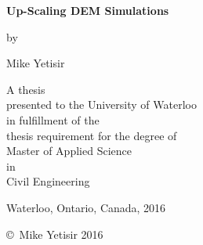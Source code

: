 \pagestyle{empty}

\begin{titlepage}
        \begin{center}
        \vspace*{1.0cm}

        \Huge
        {\bf Up-Scaling DEM Simulations}

        \vspace*{1.0cm}

        \normalsize
        by \\

        \vspace*{1.0cm}

        \Large
        Mike Yetisir \\

        \vspace*{3.0cm}

        \normalsize
        A thesis \\
        presented to the University of Waterloo \\ 
        in fulfillment of the \\
        thesis requirement for the degree of \\
        Master of Applied Science \\
        in \\
        Civil Engineering \\

        \vspace*{2.0cm}

        Waterloo, Ontario, Canada, 2016 \\

        \vspace*{1.0cm}

        \copyright\ Mike Yetisir 2016 \\
        \end{center}
\end{titlepage}

\pagestyle{plain}
\setcounter{page}{2}

